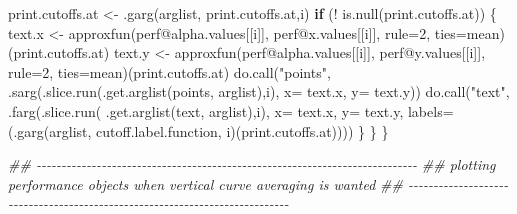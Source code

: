 \documentclass[
  letterpaper,
  DIV=11,
  numbers=noendperiod]{scrartcl}
\newenvironment{Shaded}{\begin{snugshade}}{\end{snugshade}}
\newcommand{\AttributeTok}[1]{\textcolor[rgb]{0.40,0.45,0.13}{#1}}
\newcommand{\ControlFlowTok}[1]{\textcolor[rgb]{0.00,0.23,0.31}{\textbf{#1}}}
\newcommand{\DecValTok}[1]{\textcolor[rgb]{0.68,0.00,0.00}{#1}}
\newcommand{\DocumentationTok}[1]{\textcolor[rgb]{0.37,0.37,0.37}{\textit{#1}}}
\newcommand{\FunctionTok}[1]{\textcolor[rgb]{0.28,0.35,0.67}{#1}}
\newcommand{\NormalTok}[1]{\textcolor[rgb]{0.00,0.23,0.31}{#1}}
\newcommand{\OtherTok}[1]{\textcolor[rgb]{0.00,0.23,0.31}{#1}}
\newcommand{\SpecialCharTok}[1]{\textcolor[rgb]{0.37,0.37,0.37}{#1}}
\newcommand{\StringTok}[1]{\textcolor[rgb]{0.13,0.47,0.30}{#1}}
\begin{document}
\begin{Shaded}
\begin{Highlighting}[]
\NormalTok{        print.cutoffs.at }\OtherTok{\textless{}{-}} \FunctionTok{.garg}\NormalTok{(arglist, }\StringTok{\textquotesingle{}print.cutoffs.at\textquotesingle{}}\NormalTok{,i)}
        \ControlFlowTok{if}\NormalTok{ (}\SpecialCharTok{!} \FunctionTok{is.null}\NormalTok{(print.cutoffs.at)) \{}
\NormalTok{            text.x }\OtherTok{\textless{}{-}} \FunctionTok{approxfun}\NormalTok{(perf}\SpecialCharTok{@}\NormalTok{alpha.values[[i]], perf}\SpecialCharTok{@}\NormalTok{x.values[[i]],}
                                \AttributeTok{rule=}\DecValTok{2}\NormalTok{, }\AttributeTok{ties=}\NormalTok{mean)(print.cutoffs.at)}
\NormalTok{            text.y }\OtherTok{\textless{}{-}} \FunctionTok{approxfun}\NormalTok{(perf}\SpecialCharTok{@}\NormalTok{alpha.values[[i]], perf}\SpecialCharTok{@}\NormalTok{y.values[[i]],}
                                \AttributeTok{rule=}\DecValTok{2}\NormalTok{, }\AttributeTok{ties=}\NormalTok{mean)(print.cutoffs.at)}
            \FunctionTok{do.call}\NormalTok{(}\StringTok{"points"}\NormalTok{,}
                    \FunctionTok{.sarg}\NormalTok{(}\FunctionTok{.slice.run}\NormalTok{(}\FunctionTok{.get.arglist}\NormalTok{(}\StringTok{\textquotesingle{}points\textquotesingle{}}\NormalTok{, arglist),i),}
                          \AttributeTok{x=}\NormalTok{ text.x,}
                          \AttributeTok{y=}\NormalTok{ text.y))}
            \FunctionTok{do.call}\NormalTok{(}\StringTok{"text"}\NormalTok{,}
                    \FunctionTok{.farg}\NormalTok{(}\FunctionTok{.slice.run}\NormalTok{( }\FunctionTok{.get.arglist}\NormalTok{(}\StringTok{\textquotesingle{}text\textquotesingle{}}\NormalTok{, arglist),i),}
                          \AttributeTok{x=}\NormalTok{ text.x,}
                          \AttributeTok{y=}\NormalTok{ text.y,}
                          \AttributeTok{labels=}\NormalTok{(}\FunctionTok{.garg}\NormalTok{(arglist,}
                                        \StringTok{\textquotesingle{}cutoff.label.function\textquotesingle{}}\NormalTok{,}
\NormalTok{                                        i)(print.cutoffs.at))))}
\NormalTok{        \}}
\NormalTok{    \}}
\NormalTok{\}}

\DocumentationTok{\#\# {-}{-}{-}{-}{-}{-}{-}{-}{-}{-}{-}{-}{-}{-}{-}{-}{-}{-}{-}{-}{-}{-}{-}{-}{-}{-}{-}{-}{-}{-}{-}{-}{-}{-}{-}{-}{-}{-}{-}{-}{-}{-}{-}{-}{-}{-}{-}{-}{-}{-}{-}{-}{-}{-}{-}{-}{-}{-}{-}{-}{-}{-}{-}{-}{-}{-}{-}{-}{-}{-}{-}{-}{-}{-}{-}{-}}
\DocumentationTok{\#\# plotting performance objects when vertical curve averaging is wanted}
\DocumentationTok{\#\# {-}{-}{-}{-}{-}{-}{-}{-}{-}{-}{-}{-}{-}{-}{-}{-}{-}{-}{-}{-}{-}{-}{-}{-}{-}{-}{-}{-}{-}{-}{-}{-}{-}{-}{-}{-}{-}{-}{-}{-}{-}{-}{-}{-}{-}{-}{-}{-}{-}{-}{-}{-}{-}{-}{-}{-}{-}{-}{-}{-}{-}{-}{-}{-}{-}{-}{-}{-}{-}{-}{-}{-}{-}{-}{-}{-}}


\end{Highlighting}
\end{Shaded}
\end{document}
